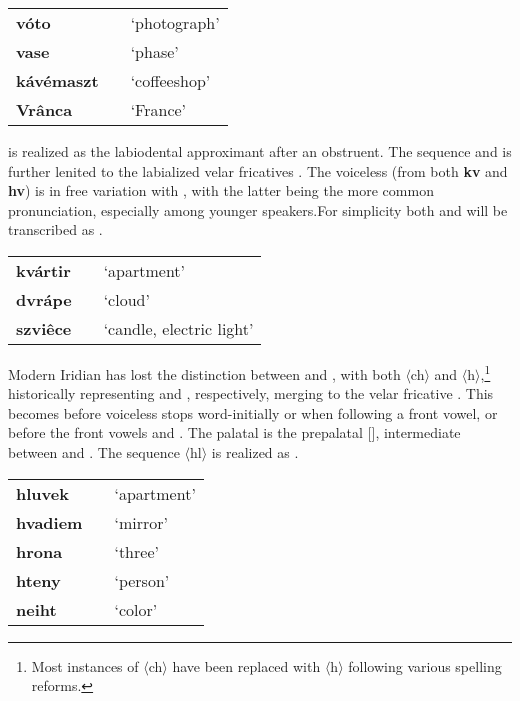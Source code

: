 \begin{center}\small
	\begin{tabularx}{0.8\textwidth}{>{\bfseries}YYY}
		vóto		& 		&`photograph'\\
 		vase		& 			&`phase'\\
 		kávémaszt	& 	&`coffeeshop'\\
 		Vrânca		&  & `France'\\
	\end{tabularx}
\end{center}

\par {} is realized as the labiodental approximant  after an obstruent. The sequence  and  is further lenited to the labialized velar fricatives . The voiceless  (from both \textbf{kv} and \textbf{hv}) is in free variation with , with the latter being the more common pronunciation, especially among younger speakers.For simplicity both  and  will be transcribed as .

\begin{center} \small
	\begin{tabularx}{0.8\textwidth}{>{\bfseries}YYY}
		kvártir		&  			& `apartment'\\
		dvrápe		& 				&`cloud'\\
		szviêce		& 	& `candle, electric light'\\
	\end{tabularx}
\end{center}

\par Modern Iridian has lost the distinction between  and , with both $\langle$ch$\rangle$ and $\langle$h$\rangle$,\footnote{Most instances of $\langle$ch$\rangle$ have been replaced with $\langle$h$\rangle$ following various spelling reforms.} historically representing  and , respectively, merging to the velar fricative . This becomes  before voiceless stops word-initially or when following a front vowel, or before the front vowels  and . The palatal  is the prepalatal [], intermediate between  and . The sequence $\langle$hl$\rangle$ is realized as \bt{\textbeltl}.

\begin{center} \small
	\begin{tabularx}{0.8\textwidth}{>{\bfseries}YYY}
		hluvek		& 		& `apartment'\\
		hvadiem		& 				&`mirror'\\
		hrona		& 	& `three'\\
		hteny		& 	&`person'\\
		neiht		&  & `color'\\
	\end{tabularx}
\end{center}
